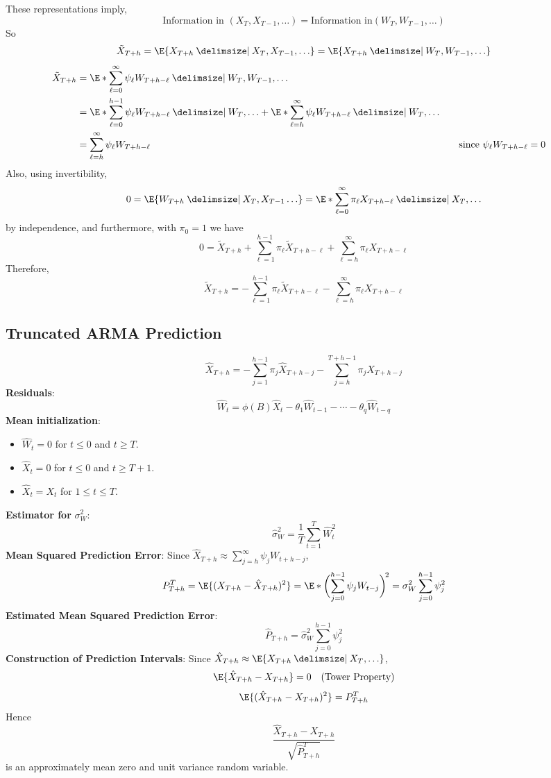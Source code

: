 These representations imply,
\[ \text{Information in }(X_T,X_{T-1},\ldots)=\text{Information in}
    (W_T,W_{T-1},\ldots) \]
So
\[ \tilde{X}_{T+h}=\E{X_{T+h}\given X_{T},X_{T-1},\ldots}=
    \E{X_{T+h}\given W_{T},W_{T-1},\ldots} \]
\begin{align*}
    \tilde{X}_{T+h}
     & =\E*{\sum_{\ell=0}^{\infty} \psi_\ell W_{T+h-\ell}\given W_T,W_{T-1},\ldots}                                                     \\
     & =\E*{\sum_{\ell=0}^{h-1} \psi_\ell W_{T+h-\ell}\given W_T,\ldots}
    +\E*{\sum_{\ell=h}^{\infty} \psi_\ell W_{T+h-\ell}\given W_{T},\ldots}                                                              \\
     & =\sum_{\ell=h}^{\infty} \psi_\ell W_{T+h-\ell}                               & \quad & \text{since $ \psi_\ell W_{T+h-\ell}=0 $}
\end{align*}
Also, using invertibility,
\[ 0=\E{W_{T+h}\given X_T,X_{T-1}\ldots}=
    \E*{\sum_{\ell=0}^{\infty} \pi_\ell X_{T+h-\ell}\given X_T,\ldots} \]
by independence, and furthermore, with $ \pi_0=1 $ we have
\[ 0=\tilde{X}_{T+h}+\sum_{\ell=1}^{h-1} \pi_\ell \tilde{X}_{T+h-\ell}+
    \sum_{\ell=h}^{\infty} \pi_\ell X_{T+h-\ell} \]
Therefore,
\[ \tilde{X}_{T+h}=-\sum_{\ell=1}^{h-1} \pi_\ell \tilde{X}_{T+h-\ell}-
    \sum_{\ell=h}^{\infty} \pi_\ell X_{T+h-\ell} \]

\subsection*{Truncated ARMA Prediction}
\[ \hat{X}_{T+h}=-\sum_{j=1}^{h-1}\pi_j\hat{X}_{T+h-j}-\sum_{j=h}^{T+h-1} \pi_j X_{T+h-j}  \]
\textbf{Residuals}:
\[ \hat{W}_t=\phi(B)\hat{X}_t-\theta_1\hat{W}_{t-1}-\cdots-\theta_q \hat{W}_{t-q} \]
\textbf{Mean initialization}:
\begin{itemize}
    \item $ \hat{W}_t=0 $ for $ t\le 0 $ and $ t\ge T $.
    \item $ \hat{X}_t=0 $ for $ t\le 0 $ and $ t\ge T+1 $.
    \item $ \hat{X}_t=X_t $ for $ 1\le t\le T $.
\end{itemize}
\textbf{Estimator for} $ \sigma_W^2 $:
\[ \hat{\sigma}_W^2=
    \frac{1}{T} \sum_{t=1}^{T} \hat{W}_t^2 \]
\textbf{Mean Squared Prediction Error}:
Since $ \hat{X}_{T+h}\approx \sum_{j=h}^{\infty} \psi_j W_{t+h-j} $,
\[ P_{T+h}^T=\E{(X_{T+h}-\hat{X}_{T+h})^2}
    =\E*{\biggl(\sum_{j=0}^{h-1} \psi_j W_{t-j}\biggr)^{\!2}}=\sigma_W^2 \sum_{j=0}^{h-1} \psi_j^2 \]
\textbf{Estimated Mean Squared Prediction Error}:
\[ \hat{P}_{T+h}=\hat{\sigma}_W^2 \sum_{j=0}^{h-1} \psi_j^2 \]
\textbf{Construction of Prediction Intervals}:
Since $ \hat{X}_{T+h}\approx \E{X_{T+h}\given X_T,\ldots} $,
\[ \E{\hat{X}_{T+h}-X_{T+h}}=0\quad(\text{Tower Property}) \]
\[ \E{(\hat{X}_{T+h}-X_{T+h})^2}=P_{T+h}^T \]
Hence
\[ \frac{\hat{X}_{T+h}-X_{T+h}}{\sqrt{\hat{P}_{T+h}^T}}  \]
is an approximately mean zero and unit variance random variable.

